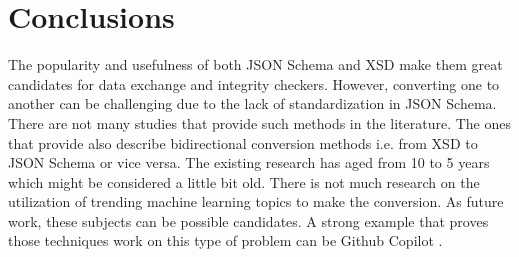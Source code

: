 \section{Conclusions}
The popularity and usefulness of both JSON Schema and XSD make them great
candidates for data exchange and integrity checkers. However, converting one to
another can be challenging due to the lack of standardization in JSON Schema.
There are not many studies that provide such methods in the literature. The ones
that provide also describe bidirectional conversion methods i.e. from XSD to
JSON Schema or vice versa. The existing research has aged from 10 to 5 years
which might be considered a little bit old. There is not much research on the
utilization of trending machine learning topics to make the conversion. As
future work, these subjects can be possible candidates. A strong example that
proves those techniques work on this type of problem can be Github Copilot
\autocite{Copilot}.